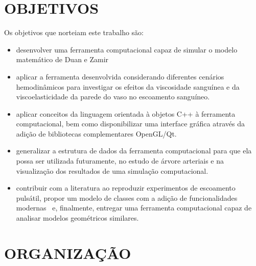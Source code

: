 \section{OBJETIVOS}\label{sec:obj}

Os objetivos que norteiam este trabalho são:
\begin{itemize}
	\item desenvolver uma ferramenta computacional capaz de simular o modelo matemático de Duan e Zamir~\cite{Duan1992}
	\item aplicar a ferramenta desenvolvida considerando diferentes cenários hemodinâmicos para investigar os efeitos da viscosidade sanguínea e da viscoelasticidade da parede do vaso no escoamento sanguíneo.
	\item aplicar conceitos da linguagem orientada à objetos C++ à ferramenta computacional, bem como disponibilizar uma interface gráfica através da adição de bibliotecas complementares OpenGL/Qt.
	\item generalizar a estrutura de dados da ferramenta computacional para que ela possa ser utilizada futuramente, no estudo de árvore arteriais e na visualização dos resultados de uma simulação computacional.
	\item contribuir com a literatura ao reproduzir experimentos de escoamento pulsátil, propor um modelo de classes com a adição de funcionalidades modernas~\cite{factorypattern,QTClasses} e, finalmente, entregar uma ferramenta computacional capaz de analisar modelos geométricos similares.
\end{itemize}

\section{ORGANIZAÇÃO}\label{sec:org}

